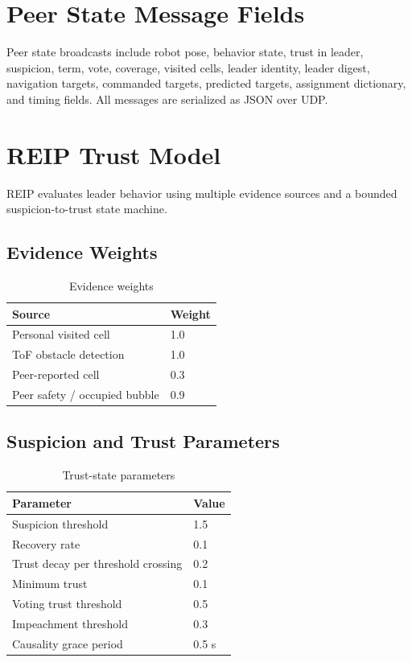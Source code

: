 \documentclass[a4paper,oneside,titlepage,11pt]{report}
\begin{document}
\section{Peer State Message Fields}
Peer state broadcasts include robot pose, behavior state, trust in leader, suspicion, term, vote, coverage, visited cells, leader identity, leader digest, navigation targets, commanded targets, predicted targets, assignment dictionary, and timing fields. All messages are serialized as JSON over UDP.

\section{REIP Trust Model}
REIP evaluates leader behavior using multiple evidence sources and a bounded suspicion-to-trust state machine.

\subsection{Evidence Weights}
\begin{table}[H]
\centering
\caption{Evidence weights}
\label{tab:evidence_weights}
\begin{tabular}{ll}
\toprule
\textbf{Source} & \textbf{Weight} \\
\midrule
Personal visited cell & 1.0 \\
ToF obstacle detection & 1.0 \\
Peer-reported cell & 0.3 \\
Peer safety / occupied bubble & 0.9 \\
\bottomrule
\end{tabular}
\end{table}

\subsection{Suspicion and Trust Parameters}
\begin{table}[H]
\centering
\caption{Trust-state parameters}
\label{tab:trust_params}
\begin{tabular}{ll}
\toprule
\textbf{Parameter} & \textbf{Value} \\
\midrule
Suspicion threshold & 1.5 \\
Recovery rate & 0.1 \\
Trust decay per threshold crossing & 0.2 \\
Minimum trust & 0.1 \\
Voting trust threshold & 0.5 \\
Impeachment threshold & 0.3 \\
Causality grace period & 0.5 s \\
\bottomrule
\end{tabular}
\end{table}
\end{document}
